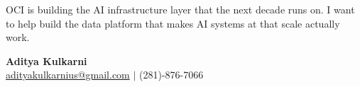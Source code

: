 \documentclass[11pt,letterpaper]{article}
\begin{document}
\vspace{8pt}

OCI is building the AI infrastructure layer that the next decade runs on. I want to help build the data platform that makes AI systems at that scale actually work.

\vspace{12pt}

{\color{OracleRed} \textbf{Aditya Kulkarni}} \\
\href{mailto:adityakulkarnius@gmail.com}{adityakulkarnius@gmail.com} \quad $|$ \quad (281)-876-7066
\end{document}
